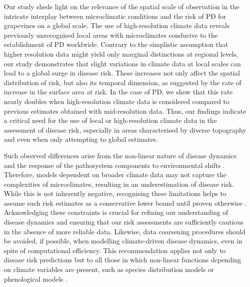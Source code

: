 Our study sheds light on the  relevance of the spatial scale of observation
in the intricate interplay between microclimatic conditions and the risk of PD
for grapevines on a global scale. The use of high-resolution climate data
reveals previously unrecognised local areas with microclimates conducive to the
establishment of PD worldwide. Contrary to the simplistic assumption that
higher resolution data might yield only marginal distinctions at regional
levels, our study demonstrates that slight variations in climate data at local
scales can lead to a global surge in disease risk. These increases  not only
affect the spatial distribution of risk, but also its temporal dimension, as
suggested by the rate of increase in the surface area at risk. In the case of
PD, we show that this rate nearly doubles when high-resolution climate data is
considered compared to previous estimates obtained with mid-resolution data.
Thus, our findings indicate a critical need for the use of local or
high-resolution climate data in the assessment of disease risk, especially in
areas characterised by diverse topography and even when only attempting to
global estimates.

Such observed differences arise from the non-linear nature of disease
dynamics and the response of the pathosystem components to environmental shifts
\cite{scherm1994global,Dudney2021}. Therefore, models dependent on broader
climate data may not capture the complexities of microclimates, resulting in an
underestimation of disease risk.  While this is not inherently negative,
recognising these limitations helps to assume such risk estimates as a
conservative lower bound until proven otherwise . Acknowledging these
constraints is crucial for refining our understanding of disease dynamics and
ensuring that our risk assessments are sufficiently cautious in the absence of
more reliable data. Likewise, data coarsening procedures should be avoided, if
possible, when modelling climate-driven disease dynamics, even in spite of
computational efficiency. This recommendation applies not only to disease risk
predictions but to all those in which non-linear functions depending on climate
variables are present, such as species distribution models or phenological
models \cite{menzel2006european}.

